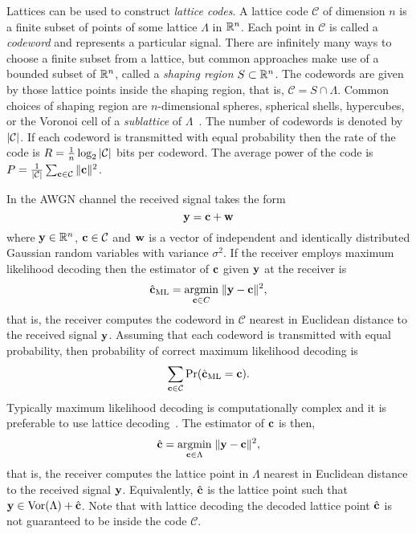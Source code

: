 \documentclass[journal, onecolumn, 11pt]{IEEEtran}
\begin{document}
\newcommand{\calX}{\mathcal X}
\newcommand{\calC}{\mathcal C}
Lattices can be used to construct \emph{lattice codes}.  A lattice code $\calC$ of dimension $n$ is a finite subset of points of some lattice $\Lambda$ in ${\mathbb R}^n$.  Each point in $\calC$ is called a \emph{codeword} and represents a particular signal.  There are infinitely many ways to choose a finite subset from a lattice, but common approaches make use of a bounded subset of ${\mathbb R}^n$, called a \emph{shaping region} $S \subset {\mathbb R}^n$.  The codewords are given by those lattice points inside the shaping region, that is, $\calC = S \cap \Lambda.$  Common choices of shaping region are $n$-dimensional spheres, spherical shells, hypercubes, or the Voronoi cell of a \emph{sublattice} of $\Lambda$~\cite{Buda1989_some_opt_codes_structure,Erex2004_lattice_decoding,Conway1983VoronoiCodes}.  The number of codewords is denoted by $\abs{\calC}$.  If each codeword is transmitted with equal probability then the rate of the code is $R = \frac{1}{n}\log_2{\abs{\calC}}$ bits per codeword.  The average power of the code is $P = \frac{1}{\abs{\calC}}\sum_{\cbf \in \calC}\|\cbf\|^2$. 

In the AWGN channel the received signal takes the form
\[
\mathbf{y} = \mathbf{c} + \mathbf{w}
\]
where $\mathbf{y} \in {\mathbb R}^n$, $\cbf \in \calC$ and $\mathbf{w}$ is a vector of independent and identically distributed Gaussian random variables with variance $\sigma^2$.  If the receiver employs maximum likelihood decoding then the estimator of $\mathbf{c}$ given $\mathbf{y}$ at the receiver is
\begin{equation}\label{eq:mldecoder}
\hat{\cbf}_{\text{ML}} = \underset{\cbf \in C}{\operatorname{argmin}}\;\| \ybf - \cbf \|^2,
\end{equation}
that is, the receiver computes the codeword in $\calC$ nearest in Euclidean distance to the received signal $\mathbf{y}$.  Assuming that each codeword is transmitted with equal probability, then probability of correct maximum likelihood decoding is
\[
\sum_{\cbf \in \calC}\prob( \hat{\cbf}_{\text{ML}} = \cbf ).
\]
Typically maximum likelihood decoding is computationally complex and it is preferable to use lattice decoding~\cite{Agrell2002,Erex2004_lattice_decoding}.  The estimator of $\mathbf{c}$ is then,
\begin{equation}\label{eq:latticedecoder}
\hat{\cbf} = \underset{\cbf \in \Lambda}{\operatorname{argmin}}\;\| \ybf - \cbf \|^2,
\end{equation}
that is, the receiver computes the lattice point in $\Lambda$ nearest in Euclidean distance to the received signal $\mathbf{y}$.  Equivalently, $\hat{\mathbf{c}}$ is the lattice point such that $\mathbf{y} \in \operatorname{Vor}(\Lambda) + \hat{\mathbf{c}}$.  Note that with lattice decoding the decoded lattice point $\hat{\mathbf{c}}$ is not guaranteed to be inside the code $\calC$.
\end{document}

